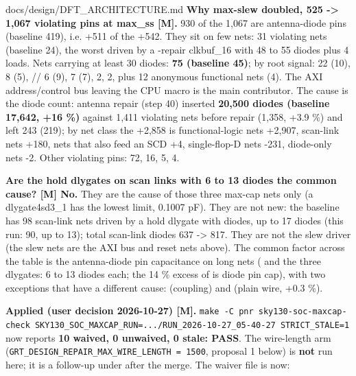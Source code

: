 \begin{relocated}{docs/design/DFT_ARCHITECTURE.md}
\textbf{Why max-slew doubled, 525 -\textgreater{} 1,067 violating pins
at max\_ss {[}M{]}.} 930 of the 1,067 are antenna-diode pins (baseline
419), i.e. +511 of the +542. They sit on few nets: 31 violating nets
(baseline 24), the worst driven by a -repair clkbuf\_16 with
48 to 55 diodes plus 4  loads. Nets carrying at least 30
diodes: \textbf{75 (baseline 45)}; by root signal:
 22 (10),  8
(5), // 6 (9),
 7 (7),  2,
 2, plus 12 anonymous functional nets (4). The AXI
address/\allowbreak{}control bus leaving the CPU macro is the main
contributor. The cause is the diode count: antenna repair (step 40)
inserted \textbf{20,500 diodes (baseline 17,642, +16 \%)} against 1,411
violating nets before repair (1,358, +3.9 \%) and left 243 (219); by net
class the +2,858 is functional-logic nets +2,907, scan-link nets +180,
nets that also feed an SCD +4, single-flop-D nets -231, diode-only nets
-2. Other violating pins:  72,  16,
 5,  4.

\textbf{Are the hold dlygates on scan links with 6 to 13 diodes the
common cause? {[}M{]} No.} They are the cause of those three max-cap
nets only (a dlygate4sd3\_\allowbreak{}1 has the lowest limit, 0.1007
pF). They are not new: the baseline has 98 scan-link nets driven by a
hold dlygate with diodes, up to 17 diodes (this run: 90, up to 13);
total scan-link diodes 637 -\textgreater{} 817. They are not the slew
driver (the slew nets are the AXI bus and reset nets above). The common
factor across the table is the antenna-diode pin capacitance on long
nets ( and the three dlygates: 6 to 13 diodes each; the
14 \% excess of  is diode pin cap), with two exceptions
that have a different cause:  (coupling) and
 (plain wire, +0.3 \%).

\textbf{Applied (user decision 2026-10-27) {[}M{]}.}
\texttt{make\ -\allowbreak{}C\ pnr\ sky130-\allowbreak{}soc-\allowbreak{}maxcap-\allowbreak{}check\ SKY130\_\allowbreak{}SOC\_\allowbreak{}MAXCAP\_\allowbreak{}RUN=\allowbreak{}.\allowbreak{}.\allowbreak{}.\allowbreak{}/\allowbreak{}RUN\_\allowbreak{}2026-\allowbreak{}10-\allowbreak{}27\_\allowbreak{}05-\allowbreak{}40-\allowbreak{}27\ STRICT\_\allowbreak{}STALE=\allowbreak{}1}
now reports \textbf{10 waived, 0 unwaived, 0 stale: PASS}. The
wire-length arm
(\texttt{GRT\_\allowbreak{}DESIGN\_\allowbreak{}REPAIR\_\allowbreak{}MAX\_\allowbreak{}WIRE\_\allowbreak{}LENGTH\ =\allowbreak{}\ 1500},
proposal 1 below) is \textbf{not} run here; it is a follow-up under
 after the merge. The waiver file 
is now:


\end{relocated}
